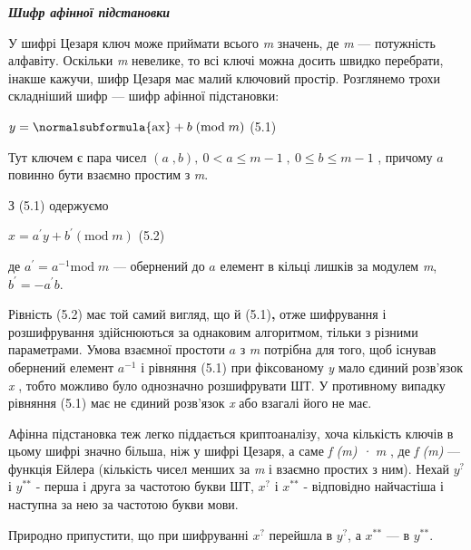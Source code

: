 \bigskip


\bigskip


\bigskip

{\centering\bfseries\itshape
Шифр афінної підстановки
\par}


\bigskip


\bigskip

У шифрі Цезаря ключ може приймати всього \textit{m}\textbf{\textit{ }}значень,
де \textit{m }---\textit{ }потужність алфавіту. Оскільки  \textit{m} невелике, то
всі ключі можна досить швидко перебрати, інакше кажучи, шифр Цезаря має малий
ключовий простір. Розглянемо трохи складніший шифр --- шифр афінної підстановки:

{\raggedleft
  ${y=\normalsubformula{\text{ax}}+b\;(\text{mod}\;m)}$  (5.1)
\par}

Тут ключем є пара чисел  ${(a\;,b),\ 0<a\le m-1\;,\ 0\le b\le m-1}$ , причому 
${a}$ повинно бути взаємно простим з \textit{m}.

З (5.1)\textbf{ }одержуємо

{\raggedleft
  ${x={a}^{'}y+{b}^{'}(\text{mod}\;m)}$  (5.2)
\par}

де  ${{a}^{'}=a^{{-1}}\text{mod}\;m}$ --- обернений до  ${a}$ елемент в кільці
лишків за модулем \textit{m},   ${{b}^{'}=-{a}^{'}b}$.

Рівність (5.2)\textbf{ }має той самий вигляд, що й (5.1)\textbf{, }отже
шифрування і розшифрування здійснюються за однаковим алгоритмом, тільки з
різними параметрами. Умова взаємної простоти  ${a}$ з \textit{m} потрібна для
того, щоб існував обернений елемент  ${a^{{-1}}}$ і рівняння (5.1) при
фіксованому \textit{y} мало єдиний розв’язок  \textit{x} , тобто можливо було
однозначно розшифрувати ШТ. У противному випадку рівняння (5.1) має не єдиний
розв’язок  \textit{x} або взагалі його не має.

Афінна підстановка теж легко піддається криптоаналізу, хоча кількість ключів в
цьому шифрі значно більша, ніж у шифрі Цезаря, а саме 
\textit{\textgreek{f}}\textit{ (m) · }\textit{m} , де
\textit{\textgreek{f}}\textit{ (m)} --- функція Ейлера (кількість чисел менших за
\textit{m} і взаємно простих з ним). Нехай   ${y^{{?}}}$ і  ${y^{{\text{**}}}}$
- перша і друга за частотою букви ШТ,  ${x^{{?}}}$ і  ${x^{{\text{**}}}}$ -
відповідно найчастіша і наступна за нею за частотою букви мови.

Природно припустити, що при шифруванні  ${x^{{?}}}$ перейшла в  ${y^{{?}}}$, а 
${x^{{\text{**}}}}$ --- в  ${y^{{\text{**}}}}$.

